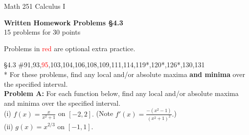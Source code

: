 \documentclass[11pt]{report}
\theoremstyle{plain}
\begin{document}
\hfill Math 251 Calculus I
\begin{center}
\Large{\textbf{Written Homework Problems \S 4.3}} \\
15 problems for 30 points\\
\end{center}

Problems in \textcolor{red}{red} are optional extra practice.

\begin{description}
\item{\S 4.3} \#91,93,\textcolor{red}{95},103,104,106,108,109,111,114,119*,120*,126*,130,131\\

* For these problems, find any local and/or absolute maxima \textbf{and minima} over the specified interval.\\

\textbf{Problem A:} For each function below, find any local and/or absolute maxima and minima over the specified interval.\\

(i) $f(x)=\frac{x}{x^2+1}$ on $[-2,2].$ (Note $f'(x)=\frac{-(x^2-1)}{(x^2+1)^2}.$)
\\

(ii) $g(x)=x^{2/3}$ on $[-1,1].$


\end{description}
\end{document}
